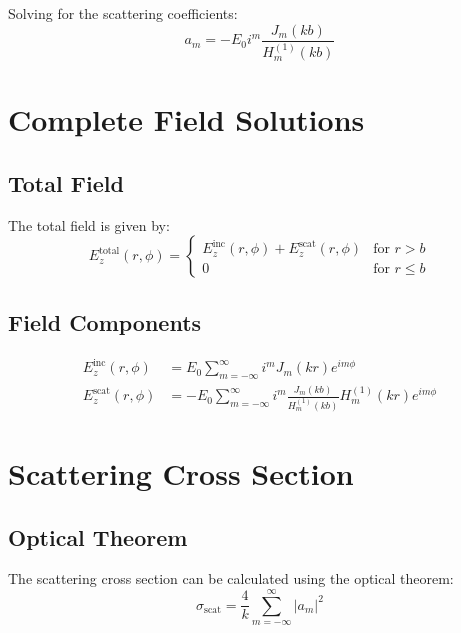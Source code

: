\documentclass[11pt,a4paper]{article}
\begin{document}
Solving for the scattering coefficients:
\begin{equation}
a_m = -E_0 i^m \frac{J_m(kb)}{H_m^{(1)}(kb)} \label{eq:scattering_coefficients}
\end{equation}

\section{Complete Field Solutions}

\subsection{Total Field}

The total field is given by:
\begin{equation}
E_z^{\text{total}}(r,\phi) = \begin{cases}
E_z^{\text{inc}}(r,\phi) + E_z^{\text{scat}}(r,\phi) & \text{for } r > b \\
0 & \text{for } r \leq b
\end{cases} \label{eq:total_field}
\end{equation}

\subsection{Field Components}

\begin{align}
E_z^{\text{inc}}(r,\phi) &= E_0 \sum_{m=-\infty}^{\infty} i^m J_m(kr) e^{im\phi} \label{eq:incident_final} \\
E_z^{\text{scat}}(r,\phi) &= -E_0 \sum_{m=-\infty}^{\infty} i^m \frac{J_m(kb)}{H_m^{(1)}(kb)} H_m^{(1)}(kr) e^{im\phi} \label{eq:scattered_final}
\end{align}

\section{Scattering Cross Section}

\subsection{Optical Theorem}

The scattering cross section can be calculated using the optical theorem:
\begin{equation}
\sigma_{\text{scat}} = \frac{4}{k} \sum_{m=-\infty}^{\infty} |a_m|^2 \label{eq:scattering_cross_section}
\end{equation}
\end{document}

